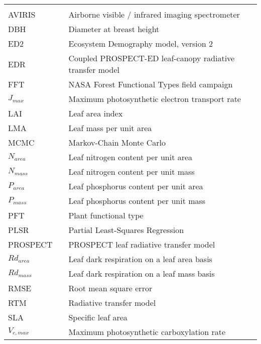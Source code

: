 \begin{center}
  \begin{tabular}{lll}
    \hspace*{2em} & \hspace*{1in} & \hspace*{4.5in} \\
    AVIRIS & \dotfill & Airborne visible / infrared imaging spectrometer \\
    DBH & \dotfill & Diameter at breast height \\
    ED2 & \dotfill & Ecosystem Demography model, version 2 \\
    EDR & \dotfill & Coupled PROSPECT-ED leaf-canopy radiative transfer model \\
    FFT & \dotfill & NASA Forest Functional Types field campaign \\
    $J_{max}$ & \dotfill & Maximum photosynthetic electron transport rate \\
    LAI & \dotfill & Leaf area index \\
    LMA & \dotfill & Leaf mass per unit area \\
    MCMC & \dotfill & Markov-Chain Monte Carlo \\
    $N_{area}$ & \dotfill & Leaf nitrogen content per unit area \\
    $N_{mass}$ & \dotfill & Leaf nitrogen content per unit mass \\
    $P_{area}$ & \dotfill & Leaf phosphorus content per unit area \\
    $P_{mass}$ & \dotfill & Leaf phosphorus content per unit mass \\
    PFT & \dotfill & Plant functional type \\
    PLSR & \dotfill & Partial Least-Squares Regression \\
    PROSPECT & \dotfill & PROSPECT leaf radiative transfer model \\
    $Rd_{area}$ & \dotfill & Leaf dark respiration on a leaf area basis \\
    $Rd_{mass}$ & \dotfill & Leaf dark respiration on a leaf mass basis \\
    RMSE & \dotfill & Root mean square error \\
    RTM & \dotfill & Radiative transfer model \\
    SLA & \dotfill & Specific leaf area \\
    $V_{c,max}$ & \dotfill & Maximum photosynthetic carboxylation rate \\
  \end{tabular}
\end{center}
\cleardoublepage


\newpage
\endofprelim

